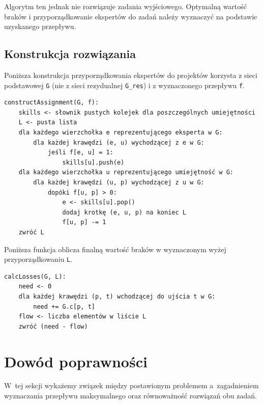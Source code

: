 \documentclass[12pt,a4paper]{article}
\theoremstyle{definition}
\begin{document}
\vspace{0.5em}
\noindent
Algorytm ten jednak nie rozwiązuje zadania wyjściowego. Optymalną wartość braków i przyporządkowanie ekspertów do zadań należy wyznaczyć na podstawie uzyskanego przepływu.

\subsection{Konstrukcja rozwiązania}
Poniższa konstrukcja przyporządkowania ekspertów do projektów korzysta z sieci podstawowej \texttt{G} (nie z sieci rezydualnej \texttt{G\_res}) i z wyznaczonego przepływu \texttt{f}.\\

\begin{tcolorbox}[title=Wzynaczanie przydziału]
\begin{verbatim}
constructAssignment(G, f):
    skills <- słownik pustych kolejek dla poszczególnych umiejętności
    L <- pusta lista
    dla każdego wierzchołka e reprezentującego eksperta w G:
        dla każdej krawędzi (e, u) wychodzącej z e w G:
            jeśli f[e, u] = 1:
                skills[u].push(e)
    dla każdego wierzchołka u reprezentującego umiejętność w G:
        dla każdej krawędzi (u, p) wychodzącej z u w G:
            dopóki f[u, p] > 0:
                e <- skills[u].pop()
                dodaj krotkę (e, u, p) na koniec L
                f[u, p] -= 1
    zwróć L
\end{verbatim}
\end{tcolorbox}

\vspace{0.5em}
\noindent
Poniższa funkcja oblicza finalną wartość braków w wyznaczonym wyżej przyporządkowaniu \texttt{L}.\\

\begin{tcolorbox}[title=Wzynaczanie braków]
\begin{verbatim}
calcLosses(G, L):
    need <- 0
    dla każdej krawędzi (p, t) wchodzącej do ujścia t w G:
        need += G.c[p, t]
    flow <- liczba elementów w liście L
    zwróć (need - flow)
\end{verbatim}
\end{tcolorbox}

\section{Dowód poprawności}
\label{sec:correctnessproof}

W~tej sekcji wykażemy związek między postawionym problemem a~zagadnieniem
wyznaczania przepływu maksymalnego oraz równoważność rozwiązań obu zadań.\\
\end{document}

